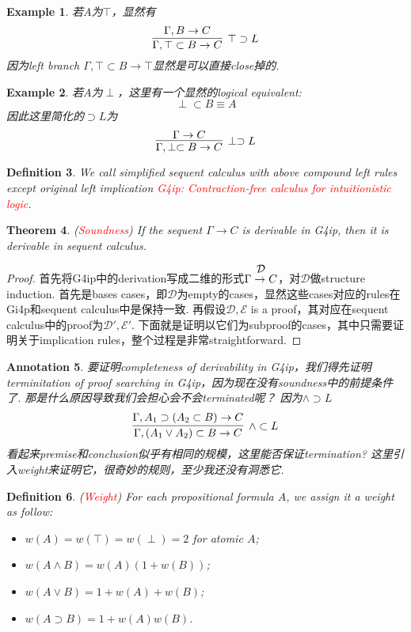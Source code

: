 \documentclass{article}
\theoremstyle{plain}
\newtheorem{theorem}{Theorem}
\newtheorem{example}[theorem]{Example}
\newtheorem{definition}[theorem]{Definition}
\newtheorem{annotation}[theorem]{Annotation}
\newcounter{case}
\theoremstyle{nonumberplain}
\newtheorem{proof}{Proof}
\newcommand{\redt}[1]{\textcolor{red}{#1}}
\begin{document}
\begin{example}
\rm 若$A$为$\top$，显然有
$$
\infer[\top \supset L]{\Gamma, \top \subset B \to C}{\Gamma, B \to C}
$$
因为left branch $\Gamma, \top \subset B \to \top$显然是可以直接close掉的. 
\end{example}

\begin{example}
\rm 若$A$为$\perp$，这里有一个显然的logical equivalent:
$$
\perp \subset B \equiv A
$$
因此这里简化的$\supset L$为
$$
\infer[\perp \supset L]{\Gamma, \perp \subset B \to C}{\Gamma \to C}
$$
\end{example}

\begin{definition}
\rm We call simplified sequent calculus with above compound left rules except original left implication \redt{G4ip: Contraction-free calculus for intuitionistic logic}.
\end{definition}

\begin{theorem}
\rm (\redt{Soundness}) If the sequent $\Gamma \to C$ is derivable in G4ip, then it is derivable in sequent calculus.
\end{theorem}

\begin{proof}
\rm  首先将G4ip中的derivation写成二维的形式$\deduce{\Gamma \to C}{\mathcal{D}}$，对$\mathcal{D}$做structure induction. 首先是bases cases，即$\mathcal{D}$为empty的cases，显然这些cases对应的rules在Gi4p和sequent calculus中是保持一致. 再假设$\mathcal{D},\mathcal{E}$ is a proof，其对应在sequent calculus中的proof为$\mathcal{D}',\mathcal{E}'$. 下面就是证明以它们为subproof的cases，其中只需要证明关于implication rules，整个过程是非常straightforward. 
\end{proof}

\begin{annotation}
\rm 要证明completeness of derivability in G4ip，我们得先证明terminitation of proof searching in G4ip，因为现在没有soundness中的前提条件了. 那是什么原因导致我们会担心会不会terminated呢？ 因为$\wedge \supset L$
$$
\infer[\wedge \subset L]{\Gamma, (A_1 \vee A_2) \subset B \to C}{\Gamma, A_1 \supset (A_2 \subset B) \to C}
$$
看起来premise和conclusion似乎有相同的规模，这里能否保证termination? 这里引入weight来证明它，很奇妙的规则，至少我还没有洞悉它. 
\end{annotation}

\begin{definition}
\rm (\redt{Weight}) For each propositional formula $A$, we assign it a weight as follow:
\begin{itemize}
	\item $w(A)=w(\top)=w(\perp) = 2$ for atomic $A$;
	\item $w(A \wedge B) = w(A)(1+w(B))$;
	\item $w(A \vee B) = 1 + w(A) + w(B)$;
	\item $w(A \supset B) = 1 + w(A)w(B)$.
\end{itemize}
\end{definition}
\end{document}

